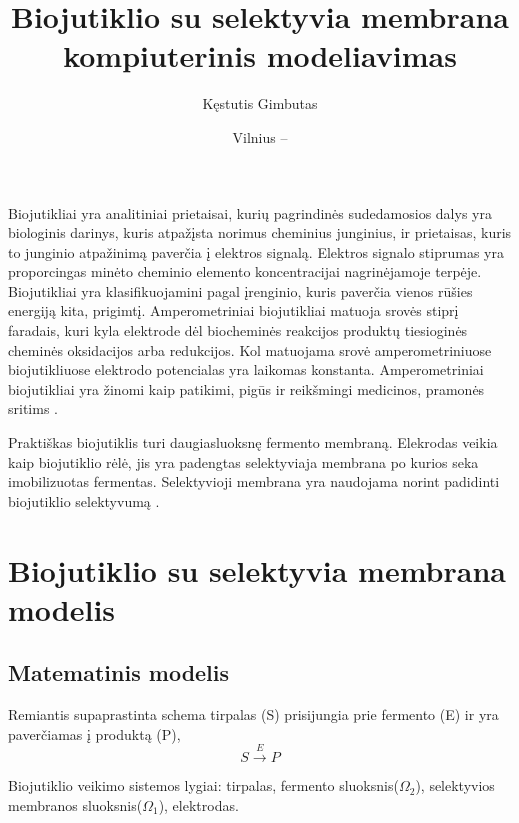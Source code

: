\documentclass[12pt, a4paper, lithuanian]{article}
\title{Biojutiklio su selektyvia membrana kompiuterinis modeliavimas}
\author{
   Kęstutis Gimbutas
}
\date{Vilnius – \the\year}
\begin{document}
\sloppy
\maketitle

\tableofcontents

Biojutikliai yra analitiniai prietaisai, kurių pagrindinės sudedamosios dalys
yra biologinis darinys, kuris atpažįsta norimus cheminius junginius, ir
prietaisas, kuris to junginio atpažinimą  paverčia į elektros signalą. Elektros
signalo stiprumas yra proporcingas minėto cheminio elemento koncentracijai
nagrinėjamoje terpėje. Biojutikliai yra klasifikuojamini pagal įrenginio, kuris
paverčia vienos rūšies energiją kita,
prigimtį. Amperometriniai biojutikliai matuoja srovės stiprį faradais, kuri
kyla elektrode dėl biocheminės reakcijos produktų tiesioginės cheminės oksidacijos 
arba redukcijos. Kol matuojama srovė amperometriniuose biojutikliuose elektrodo potencialas yra
laikomas konstanta. Amperometriniai biojutikliai yra žinomi
kaip patikimi, pigūs ir reikšmingi medicinos, pramonės sritims
\cite{baronas2006computational}.

Praktiškas biojutiklis turi daugiasluoksnę fermento membraną. Elekrodas veikia
kaip biojutiklio rėlė, jis yra padengtas selektyviaja membrana po kurios seka
imobilizuotas fermentas. Selektyvioji membrana yra naudojama norint padidinti
biojutiklio selektyvumą \cite{baronas2006computational}. \\

\section{Biojutiklio su selektyvia membrana modelis}

\subsection{Matematinis modelis}
Remiantis supaprastinta schema tirpalas (S) prisijungia prie fermento (E)
ir yra
paverčiamas į produktą (P),
\begin{equation}\label{eq:basic} 
    S \overset{E}{\rightarrow} P
\end{equation}

Biojutiklio veikimo sistemos lygiai: tirpalas, fermento sluoksnis($\Omega_2$),
selektyvios
membranos sluoksnis($\Omega_1$), elektrodas.
\end{document}
